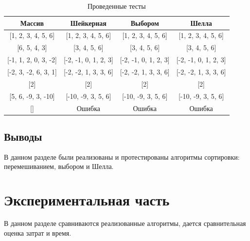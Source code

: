 \documentclass[a4paper,oneside,14pt]{extreport}
\begin{document}
\begin{table}[H]
	\begin{center}
		\captionsetup{justification=raggedleft, singlelinecheck=false}
		\caption[]{\label{tab:tests} Проведенные тесты}

	\begin{tabular}{|c|c|c|c|}
		\hline
		\rule[-1ex]{0pt}{2.5ex} Массив & Шейкерная & Выбором & Шелла \\
		\hline
		\rule[-1ex]{0pt}{2.5ex} [1, 2, 3, 4, 5, 6] & [1, 2, 3, 4, 5, 6] & [1, 2, 3, 4, 5, 6] & [1, 2, 3, 4, 5, 6] \\
		\hline
		\rule[-1ex]{0pt}{2.5ex} [6, 5, 4, 3] & [3, 4, 5, 6] & [3, 4, 5, 6] & [3, 4, 5, 6] \\
		\hline
		\rule[-1ex]{0pt}{2.5ex} [-1, 1, 2, 0, 3, -2]  & [-2, -1, 0, 1, 2, 3] & [-2, -1, 0, 1, 2, 3] & [-2, -1, 0, 1, 2, 3] \\
		\hline
		\rule[-1ex]{0pt}{2.5ex} [-2, 3, -2, 6, 3, 1] & [-2, -2, 1, 3, 3, 6] & [-2, -2, 1, 3, 3, 6] & [-2, -2, 1, 3, 3, 6] \\
		\hline
		\rule[-1ex]{0pt}{2.5ex} [2] & [2] & [2] & [2] \\
		\hline
		\rule[-1ex]{0pt}{2.5ex} [5, 6, -9, 3, -10] & [-10, -9, 3, 5, 6] & [-10, -9, 3, 5, 6] & [-10, -9, 3, 5, 6] \\
		\hline
		\rule[-1ex]{0pt}{2.5ex} [] & Ошибка & Ошибка & Ошибка \\
		\hline
		
	\end{tabular}
\end{center}
\end{table}
\section{Выводы}
В данном разделе были реализованы и протестированы алгоритмы сортировки: перемешиванием, выбором и Шелла.
\newpage

\chapter{Экспериментальная часть}
В данном разделе сравниваются реализованные алгоритмы, дается сравнительная оценка затрат и время.
\end{document}
